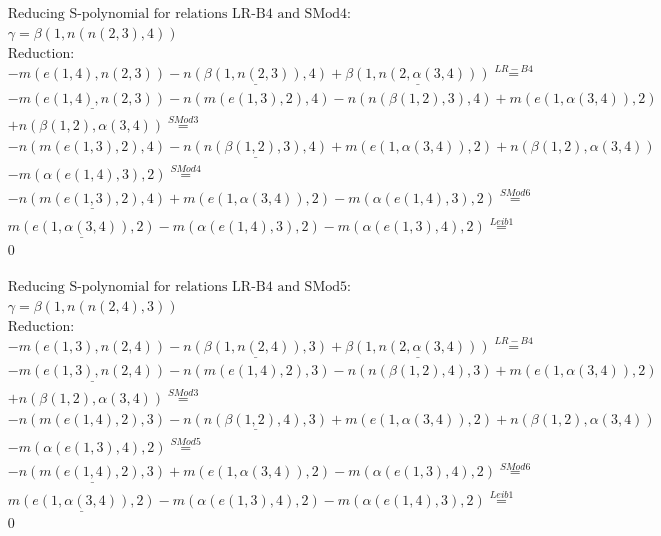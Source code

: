 \documentclass[11pt]{amsart}
\begin{document}
\begin{align*} 
& \text{Reducing S-polynomial for relations LR-B4 and SMod4:} \\ 
& \gamma = \beta(1,n(n(2,3),4)) \\ 
& \text{Reduction}: \\& - m(e(1,4),n(2,3)) - \underline{n(\beta(1,n(2,3)),4)} + \underline{\beta(1,n(2,\alpha(3,4)))} \stackrel{ LR-B4 }{=}  \\ 
& - \underline{m(e(1,4),n(2,3))} - n(m(e(1,3),2),4) - n(n(\beta(1,2),3),4) + m(e(1,\alpha(3,4)),2)\\ 
 &  + n(\beta(1,2),\alpha(3,4)) \stackrel{ SMod3 }{=}  \\ 
& - n(m(e(1,3),2),4) - \underline{n(n(\beta(1,2),3),4)} + m(e(1,\alpha(3,4)),2) + n(\beta(1,2),\alpha(3,4))\\ 
 &  - m(\alpha(e(1,4),3),2) \stackrel{ SMod4 }{=}  \\ 
& - \underline{n(m(e(1,3),2),4)} + m(e(1,\alpha(3,4)),2) - m(\alpha(e(1,4),3),2) \stackrel{ SMod6 }{=}  \\ 
&\underline{m(e(1,\alpha(3,4)),2)} - m(\alpha(e(1,4),3),2) - m(\alpha(e(1,3),4),2) \stackrel{ Leib1 }{=}  \\ 
&0\\ 
\end{align*} 
 
\begin{align*} 
& \text{Reducing S-polynomial for relations LR-B4 and SMod5:} \\ 
& \gamma = \beta(1,n(n(2,4),3)) \\ 
& \text{Reduction}: \\& - m(e(1,3),n(2,4)) - \underline{n(\beta(1,n(2,4)),3)} + \underline{\beta(1,n(2,\alpha(3,4)))} \stackrel{ LR-B4 }{=}  \\ 
& - \underline{m(e(1,3),n(2,4))} - n(m(e(1,4),2),3) - n(n(\beta(1,2),4),3) + m(e(1,\alpha(3,4)),2)\\ 
 &  + n(\beta(1,2),\alpha(3,4)) \stackrel{ SMod3 }{=}  \\ 
& - n(m(e(1,4),2),3) - \underline{n(n(\beta(1,2),4),3)} + m(e(1,\alpha(3,4)),2) + n(\beta(1,2),\alpha(3,4))\\ 
 &  - m(\alpha(e(1,3),4),2) \stackrel{ SMod5 }{=}  \\ 
& - \underline{n(m(e(1,4),2),3)} + m(e(1,\alpha(3,4)),2) - m(\alpha(e(1,3),4),2) \stackrel{ SMod6 }{=}  \\ 
&\underline{m(e(1,\alpha(3,4)),2)} - m(\alpha(e(1,3),4),2) - m(\alpha(e(1,4),3),2) \stackrel{ Leib1 }{=}  \\ 
&0\\ 
\end{align*} 
 
\end{document}

